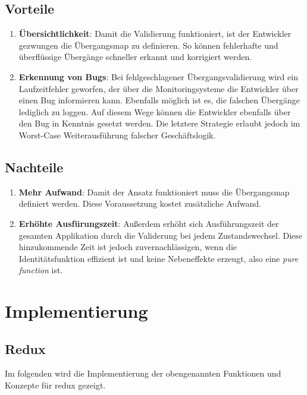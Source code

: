 \subsection{Vorteile}

\begin{enumerate}
  \item \textbf{Übersichtlichkeit}: Damit die Validierung funktioniert, ist der Entwickler gezwungen die Übergangsmap zu definieren. So können fehlerhafte und überflüssige Übergänge schneller erkannt und korrigiert werden.
  \item \textbf{Erkennung von Bugs}: Bei fehlgeschlagener Übergangsvalidierung wird ein Laufzeitfehler geworfen, der über die Monitoringsysteme die Entwickler über einen Bug informieren kann. Ebenfalls möglich ist es, die falschen Übergänge lediglich zu loggen. Auf diesem Wege können die Entwickler ebenfalls über den Bug in Kenntnis gesetzt werden. Die letztere Strategie erlaubt jedoch im Worst-Case Weiterausführung falscher Geschäftslogik.
\end{enumerate}

\subsection{Nachteile}

\begin{enumerate}
  \item \textbf{Mehr Aufwand}: Damit der Ansatz funktioniert muss die Übergangsmap definiert werden. Diese Voraussetzung kostet zusätzliche Aufwand.
  \item \textbf{Erhöhte Ausfürungszeit}: Außerdem erhöht sich Ausführungszeit der gesamten Applikation durch die Validerung bei jedem Zustandswechsel. Diese hinzukommende Zeit ist jedoch zuvernachlässigen, wenn die Identitätsfunktion effizient ist und keine Nebeneffekte erzeugt, also eine \textit{pure function} ist.
\end{enumerate}

\section{Implementierung}

\subsection{Redux}

Im folgenden wird die Implementierung der obengenannten Funktionen und Konzepte für redux gezeigt.

